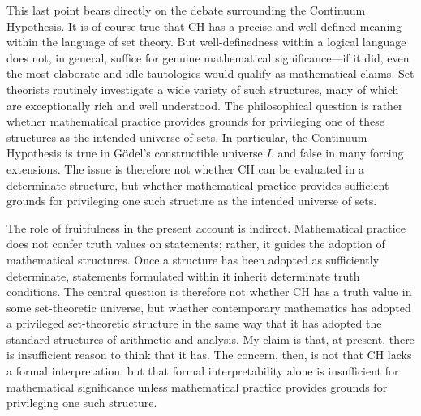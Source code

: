 \documentclass[11pt,a4paper]{article}
\begin{document}
This last point bears directly on the debate surrounding the Continuum Hypothesis. It is of course true that $\mathrm{CH}$ has a precise and well-defined meaning within the language of set theory. But well-definedness within a logical language does not, in general, suffice for genuine mathematical significance---if it did, even the most elaborate and idle tautologies would qualify as mathematical claims. Set theorists routinely investigate a wide variety of such structures, many of which are exceptionally rich and well understood. The philosophical question is rather whether mathematical practice provides grounds for privileging one of these structures as the intended universe of sets. In particular, the Continuum Hypothesis is true in Gödel's constructible universe $L$ and false in many forcing extensions. The issue is therefore not whether $\mathrm{CH}$ can be evaluated in a determinate structure, but whether mathematical practice provides sufficient grounds for privileging one such structure as the intended universe of sets.

The role of fruitfulness in the present account is indirect. Mathematical practice does not confer truth values on statements; rather, it guides the adoption of mathematical structures. Once a structure has been adopted as sufficiently determinate, statements formulated within it inherit determinate truth conditions. The central question is therefore not whether $\mathrm{CH}$ has a truth value in some set-theoretic universe, but whether contemporary mathematics has adopted a privileged set-theoretic structure in the same way that it has adopted the standard structures of arithmetic and analysis. My claim is that, at present, there is insufficient reason to think that it has. The concern, then, is not that $\mathrm{CH}$ lacks a formal interpretation, but that formal interpretability alone is insufficient for mathematical significance unless mathematical practice provides grounds for privileging one such structure.
\end{document}
